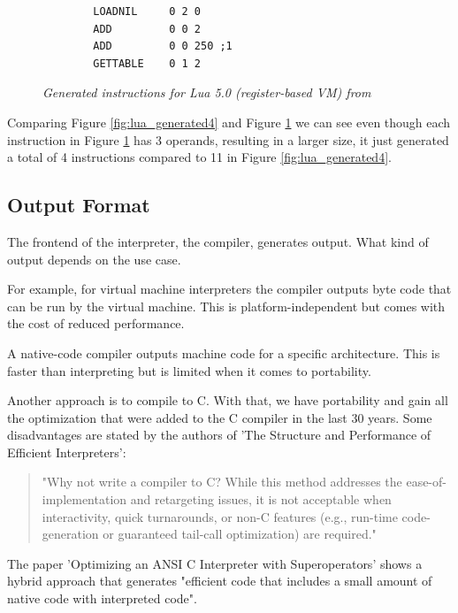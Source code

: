 \documentclass{article}
\begin{document}
\begin{figure}[ht]
    \begin{verbatim}
        LOADNIL     0 2 0
        ADD         0 0 2
        ADD         0 0 250 ;1
        GETTABLE    0 1 2
    \end{verbatim}
    \caption{\textit{Generated instructions for Lua 5.0 (register-based VM) from ~\cite{lua_implementation}}}
    \label{fig:lua_generated5}
\end{figure}

Comparing Figure \ref{fig:lua_generated4} and Figure \ref{fig:lua_generated5}
we can see even though each instruction in Figure \ref{fig:lua_generated5} has
3 operands, resulting in a larger size, it just generated a total of 4
instructions compared to 11 in Figure \ref{fig:lua_generated4}.

\subsection{Output Format}
The frontend of the interpreter, the compiler, generates output. What kind
of output depends on the use case.

For example, for virtual machine interpreters the compiler outputs byte code that
can be run by the virtual machine. This is platform-independent but comes with
the cost of reduced performance.

A native-code compiler outputs machine code for a specific architecture. This is faster
than interpreting but is limited when it comes to portability.

Another approach is to compile to C. With that, we have portability and gain all the 
optimization that were added to the C compiler in the last 30 years. Some disadvantages
are stated by the authors of 'The Structure and Performance of Efficient Interpreters':

\begin{quotation} 
"Why not write a compiler to C? While this method addresses the
ease-of-implementation and retargeting issues, it is not acceptable when
interactivity, quick turnarounds, or non-C features (e.g., run-time
code-generation or guaranteed tail-call optimization) are required."
~\cite{structure_and_performance}
\end{quotation} 

The paper 'Optimizing an ANSI C Interpreter with Superoperators' shows a hybrid
approach that generates "efficient code that includes a small amount of native
code with interpreted code". ~\cite{superoperator}
\end{document}
